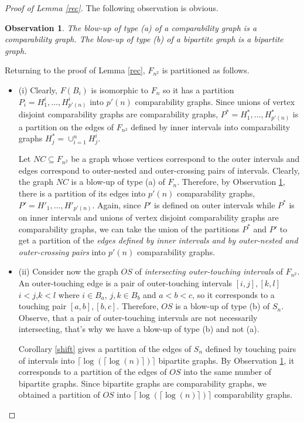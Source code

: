 \documentclass[10pt,a4paper]{amsart}
\newtheorem{observation}{Observation}
\begin{document}
\begin{proof}[Proof of Lemma \ref{rec}]
The following observation is obvious.

\begin{observation}\label{blow}
  The blow-up of type (a) of a comparability graph is a comparability graph.
    The blow-up of type (b) of a bipartite graph is a bipartite graph.
\end{observation}

Returning to the proof of Lemma \ref{rec}, $F_{n^2}$ is partitioned as follows.


\begin{itemize}

\item (i)  Clearly, $F(B_i)$ is isomorphic to $F_n$ so it has a partition
  $P_i= H^i_1, \ldots, H^i_{p'(n)}$ into $p'(n)$ comparability graphs. Since unions of vertex
  disjoint comparability graphs are comparability graphs,
  $P^*= H^*_1, \ldots, H^*_{p'(n)}$
is a partition on the edges of $F_{n^2}$ defined by
inner intervals into comparability graphs $H^*_j=\cup_{i=1}^nH^i_j$.

Let $NC\subseteq F_{n^2}$ be a graph whose vertices correspond to the outer intervals and edges
  correspond to outer-nested and
  outer-crossing pairs of intervals.
  Clearly, the graph $NC$ is a blow-up of type (a) of $F_n$. Therefore, by Observation \ref{blow}, there is a partition
  of its edges into $p'(n)$ comparability graphs,
 $P'=H'_1,\dots,H'_{p'(n)}$.
Again, since  $P'$ is defined on
outer intervals while $P^*$ is on inner intervals and
   unions of vertex
   disjoint comparability graphs are comparability graphs, we can take the union of the partitions
   $P^*$ and $P'$ to get
   a partition of the {\em edges defined by inner intervals and by outer-nested and outer-crossing pairs} into
   $p'(n)$ comparability graphs.


 \item (ii) Consider now the graph $OS$ of {\em intersecting outer-touching intervals} of $F_{n^2}$.
   An outer-touching edge is a pair of outer-touching intervals $[i,j], [k,l]$ $i<j$,$k<l$ where
   $i\in B_a$, $j, k\in B_b$ and $a<b<c$, so it corresponds to a touching pair $[a, b], [b, c]$. Therefore,
   $OS$ is a blow-up of type (b) of $S_n$. Observe, that a pair of outer-touching intervals are not necessarily intersecting,
   that's why we have a blow-up of type (b) and not (a).



   Corollary \ref{shift} gives a partition of the edges of $S_n$ defined by touching pairs of intervals
   into $\lceil\log(\lceil\log(n)\rceil)\rceil$ bipartite graphs.
   By Observation \ref{blow}, it corresponds to a partition of the edges of $OS$
   into the same number of bipartite graphs. Since bipartite graphs are comparability graphs, we
   obtained a partition of $OS$ into  $\lceil\log(\lceil\log(n)\rceil)\rceil$ comparability graphs.


\end{itemize}
\end{proof}
\end{document}
